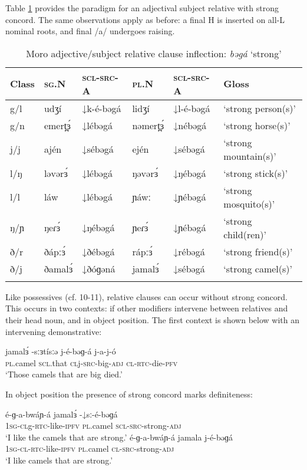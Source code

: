Table \ref{tab:ch8:4} provides the paradigm for an adjectival subject relative with strong concord. The same observations apply as before: a final H is inserted on all-L nominal roots, and final /a/ undergoes raising.%

\begin{table}
 \begin{tabular}[t]{llllll}
 \lsptoprule
Class &	\textsc{sg}.N& \textsc{scl}-\textsc{src}-A	& 	\textsc{pl}.N 	& 	\textsc{scl}-\textsc{src}-A	& Gloss\\
 \midrule
 g/l	& udʒí 	& ↓k-é-bəgá	& 	lidʒí	& ↓l-é-bəgá	& ‘strong person(s)’\\
g/n	& emert̪ɜ́& 	↓lébəgá	& 	nəmert̪ɜ́	& ↓nébəgá	& ‘strong horse(s)’\\
j/j	& ajén	& ↓sébəgá	& 	ején	& ↓sébəgá	& ‘strong mountain(s)’\\
l/ŋ	& ləvərɜ́& 	↓lébəgá	& 	ŋəvərɜ́	& ↓ŋébəgá& 	‘strong stick(s)’\\
l/l	& láw	& 	↓lébəgá	& 	ɲáwː	& ↓ɲébəgá	& ‘strong mosquito(s)’\\
ŋ/ɲ	& ŋeɾɜ́	& ↓ŋébəgá	& 	ɲeɾɜ́	& ↓ɲébəgá	& ‘strong child(ren)’\\
ð/r	& ðápːɜ́	& ↓ðébəgá	& 	rápːɜ́	& ↓rébəgá	& ‘strong friend(s)’\\
ð/j	& ðamalɜ́& 	↓ðóɡəná	& 	jamalɜ́	& ↓sébəgá	& ‘strong camel(s)’\\
 \lspbottomrule
 \end{tabular}
  \caption{Moro adjective/subject relative clause inflection: \textit{bəgá} ‘strong’}
  \label{tab:ch8:4}
\end{table}

Like possessives (cf. 10-11), relative clauses can occur without strong concord. This occurs in two contexts: if other modifiers intervene between relatives and their head noun, and in object position. The first context is shown below with an intervening demonstrative:

\ea \gll jamalɜ́		-sːɜtísːə	j-é-bəɡ-á	j-a-j-ó\\
 		\textsc{pl}.camel	\textsc{scl}.that	\textsc{cl}j-\textsc{src}-big-\textsc{adj}	\textsc{cl}-\textsc{rtc}-die-\textsc{pfv}\\
 	\glt	‘Those camels that are big died.’
\z 

In object position the presence of strong concord marks definiteness:

\ea 
	\ea \gll	é-ɡ-a-bwáɲ-á		jamalɜ́		-↓sː-é-bəɡá\\
 				1\textsc{sg}-\textsc{cl}g-\textsc{rtc}-like-\textsc{\textsc{ipfv}}	\textsc{pl}.camel	\textsc{scl}-\textsc{src}-strong-\textsc{adj}\\
 		\glt 	‘I like the camels that are strong.’
	\ex \gll	 é-ɡ-a-bwáɲ-á	jamala		j-é-bəɡá\\
 			1\textsc{sg}-\textsc{cl}-\textsc{rtc}-like-\textsc{\textsc{ipfv}}	\textsc{pl}.camel	\textsc{cl}-\textsc{src}-strong-\textsc{adj}\\
 		\glt ‘I like camels that are strong.’
	\z
\z

